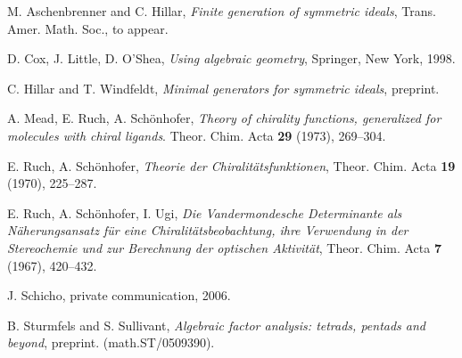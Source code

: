 \documentclass{amsart}
\theoremstyle{definition}
\theoremstyle{remark}
\numberwithin{equation}{section}
\newcommand{\<}{\langle}
\renewcommand{\>}{\rangle}
\begin{document}
\begin{thebibliography}{99}

M. Aschenbrenner and C. Hillar, \emph{Finite generation of symmetric ideals}, 
Trans. Amer. Math. Soc., to appear.



 D. Cox, J. Little, D. O'Shea, \emph{Using algebraic geometry},
Springer, New York, 1998.

C. Hillar and T. Windfeldt, \emph{Minimal generators for symmetric ideals}, preprint.

 A. Mead, E. Ruch, A. Sch\"onhofer, \emph{Theory of
    chirality functions, generalized for molecules with chiral
    ligands}.  Theor. Chim.  Acta \textbf{29} (1973), 269--304.

 E. Ruch, A. Sch\"onhofer, \emph{Theorie der
    Chiralit\"atsfunktionen}, Theor. Chim. Acta \textbf{19} (1970),
  225--287.

 E. Ruch, A. Sch\"onhofer, I. Ugi, \emph{Die
    Vandermondesche Determinante als N\"aherungsansatz f\"ur eine
    Chiralit\"atsbeobachtung, ihre Verwendung in der Stereochemie und
    zur Berechnung der optischen Aktivit\"at}, Theor. Chim.  Acta
  \textbf{7} (1967), 420--432.

J. Schicho, private communication, 2006.

B. Sturmfels and S. Sullivant, \emph{Algebraic factor analysis: tetrads, 
pentads and beyond}, preprint. (math.ST/0509390).


\end{thebibliography}
\end{document}
